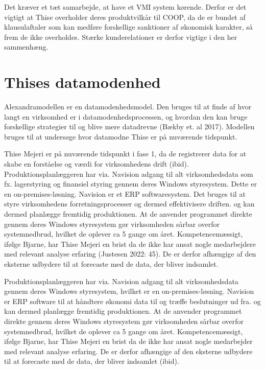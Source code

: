 \documentclass[
  12pt,
  a4paper,
  DIV=11,
  numbers=noendperiod,
  oneside,
  open=any]{scrartcl}
\begin{document}
Det kræver et tæt samarbejde, at have et VMI system kørende. Derfor er
det vigtigt at Thise overholder deres produktvilkår til COOP, da de er
bundet af klausulaftaler som kan medføre forskellige sanktioner af
økonomisk karakter, så frem de ikke overholdes. Stærke kunderelationer
er derfor vigtige i den her sammenhæng.

\hypertarget{thises-datamodenhed}{%
\section{Thises datamodenhed}\label{thises-datamodenhed}}

Alexandramodellen er en datamodenhedsmodel. Den bruges til at finde af
hvor langt en virksomhed er i datamodenhedsprocessen, og hvordan den kan
bruge forskellige strategier til og blive mere datadrevne (Bækby et. al
2017). Modellen bruges til at undersøge hvor datamodne Thise er på
nuværende tidspunkt.

Thise Mejeri er på nuværende tidspunkt i fase 1, da de registrerer data
for at skabe en forståelse og værdi for virksomhedens drift (ibid).
Produktionsplanlæggeren har via. Navision adgang til alt virksomhedsdata
som fx. lagerstyring og finansiel styring gennem deres Windows
styresystem. Dette er en on-premises-løsning. Navision er et ERP
softwaresystem. Det bruges til at styre virksomhedens
forretningsprocesser og dermed effektivisere driften. og kan dermed
planlægge fremtidig produktionen. At de anvender programmet direkte
gennem deres Windows styresystem gør virksomheden sårbar overfor
systemnedbrud, hvilket de oplever ca 5 gange om året. Kompetencemæssigt,
ifølge Bjarne, har Thise Mejeri en brist da de ikke har ansat nogle
medarbejdere med relevant analyse erfaring (Justesen 2022: 45). De er
derfor afhængige af den eksterne udbydere til at forecaste med de data,
der bliver indsamlet.

Produktionsplanlæggeren har via. Navision adgang til alt virksomhedsdata
gennem deres Windows styresystem, hvilket er en on-premises-løsning.
Navision er ERP software til at håndtere økonomi data til og træffe
beslutninger ud fra. og kan dermed planlægge fremtidig produktionen. At
de anvender programmet direkte gennem deres Windows styresystem gør
virksomheden sårbar overfor systemnedbrud, hvilket de oplever ca 5 gange
om året. Kompetencemæssigt, ifølge Bjarne, har Thise Mejeri en brist da
de ikke har ansat nogle medarbejder med relevant analyse erfaring. De er
derfor afhængige af den eksterne udbydere til at forecaste med de data,
der bliver indsamlet (ibid).
\end{document}
